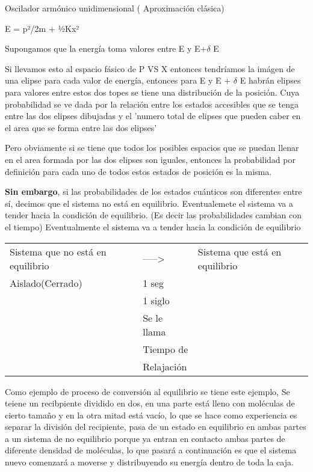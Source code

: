 \documentclass[11pt]{article}
\begin{document}
Oscilador armónico unidimensional ( Aproximación clásica)

E = p²/2m + ½Kx²


Supongamos que la energía toma valores entre E y E+$\delta$ E

Si llevamos esto al espacio fásico de P VS X entonces tendríamos la
imágen de una elipse para cada valor de energía, entonces para E y E +
$\delta$ E habrán elipses para valores entre estos dos topes se tiene
una distribución de la posición. Cuya probabilidad se ve dada por la
relación entre los estados accesibles que se tenga entre las dos
elipses dibujadas y el 'numero total de elipses que pueden caber en el
area que se forma entre las dos elipses'

Pero obviamente si se tiene que todos los posibles espacios que se
puedan llenar en el area formada por las dos elipses son iguales,
entonces la probabilidad por definición para cada uno de todos estos
estados de posición es la misma.


\textbf{Sin embargo}, si las probabilidades de los estados cuánticos son
 diferentes entre sí, decimos que el sistema no está en equilibrio.
 Eventualemete el sistema va a tender hacia la condición de
 equilibrio. (Es decir las probabilidades cambian con el tiempo)
 Eventualmente el sistema va a tender hacia la condición de equilibrio

\begin{center}
\begin{tabular}{lll}
Sistema que no está en equilibrio & -----> & Sistema que está en equilibrio\\
Aislado(Cerrado) & 1 seg & \\
 & 1 siglo & \\
 & Se le llama & \\
 & Tiempo de & \\
 & Relajación & \\
\end{tabular}
\end{center}



Como ejemplo de proceso de conversión al equilibrio se tiene este
ejemplo, Se teiene un recibpiente dividido en dos, en una parte está
lleno con moléculas de cierto tamaño y en la otra mitad está vacío, lo
que se hace como experiencia es separar la división del recipiente,
pasa de un estado en equilibrio en ambas partes a un sistema de no
equilibrio porque ya entran en contacto ambas partes de diferente
densidad de moléculas, lo que pasará a continuación es que el sistema
nuevo comenzará a moverse y distribuyendo su energía dentro de toda la
caja.
\end{document}
